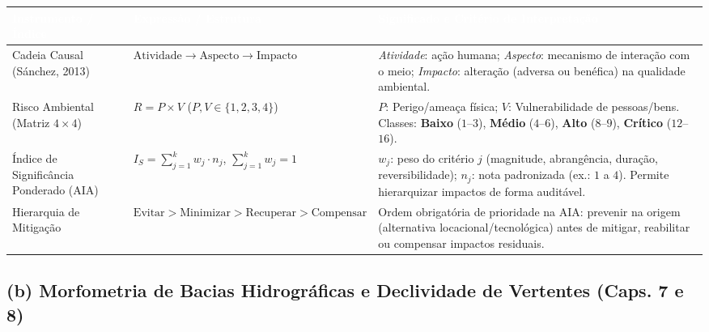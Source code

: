 \begin{center}
\renewcommand{\arraystretch}{1.28}
\small
\begin{tabularx}{\textwidth}{@{}p{3.4cm} p{4.6cm} >{\raggedright\arraybackslash}X@{}}
  \toprule
  \rowcolor{uefsNavy}
  \textcolor{white}{\bfseries Instrumento / Índice} & \textcolor{white}{\bfseries Expressão / Estrutura} & \textcolor{white}{\bfseries Significado e Critério de Interpretação} \\
  \midrule
  Cadeia Causal (Sánchez, 2013) & $\text{Atividade} \to \text{Aspecto} \to \text{Impacto}$ & \textit{Atividade}: ação humana; \textit{Aspecto}: mecanismo de interação com o meio; \textit{Impacto}: alteração (adversa ou benéfica) na qualidade ambiental. \\
  \rowcolor{bgGray}
  Risco Ambiental (Matriz $4 \times 4$) & $R = P \times V$ \newline ($P, V \in \{1, 2, 3, 4\}$) & $P$: Perigo/ameaça física; $V$: Vulnerabilidade de pessoas/bens. Classes: \textbf{Baixo} ($1$--$3$), \textbf{Médio} ($4$--$6$), \textbf{Alto} ($8$--$9$), \textbf{Crítico} ($12$--$16$). \\
  Índice de Significância Ponderado (AIA) & $I_S = \displaystyle\sum_{j=1}^{k} w_j \cdot n_j$, \quad $\displaystyle\sum_{j=1}^{k} w_j = 1$ & $w_j$: peso do critério $j$ (magnitude, abrangência, duração, reversibilidade); $n_j$: nota padronizada (ex.: $1$ a $4$). Permite hierarquizar impactos de forma auditável. \\
  \rowcolor{bgGray}
  Hierarquia de Mitigação & $\text{Evitar} > \text{Minimizar} > \text{Recuperar} > \text{Compensar}$ & Ordem obrigatória de prioridade na AIA: prevenir na origem (alternativa locacional/tecnológica) antes de mitigar, reabilitar ou compensar impactos residuais. \\
  \bottomrule
\end{tabularx}
\end{center}

\subsection*{(b) Morfometria de Bacias Hidrográficas e Declividade de Vertentes (Caps. 7 e 8)}

